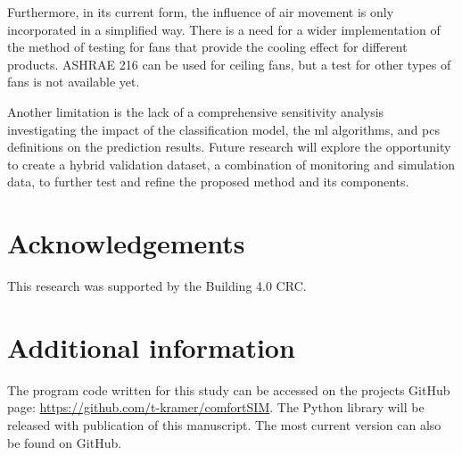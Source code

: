 Furthermore, in its current form, the influence of air movement is only incorporated in a simplified way. There is a need for a wider implementation of the method of testing for fans that provide the cooling effect for different products. ASHRAE 216 can be used for ceiling fans, but a test for other types of fans is not available yet. 

Another limitation is the lack of a comprehensive sensitivity analysis investigating the impact of the classification model, the \gls{ml} algorithms, and \gls{pcs} definitions on the prediction results. Future research will explore the opportunity to create a hybrid validation dataset, a combination of monitoring and simulation data, to further test and refine the proposed method and its components. 



\section*{Acknowledgements}
\noindent This research was supported by the Building 4.0 CRC.

\section*{Additional information}
\noindent The program code written for this study can be accessed on the projects GitHub page: \url{ https://github.com/t-kramer/comfortSIM}. The Python library will be released with publication of this manuscript. The most current version can also be found on GitHub.
